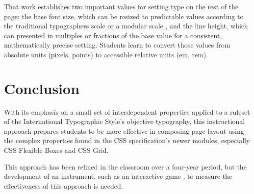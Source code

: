 \documentclass[sigconf]{acmart}
\begin{document}
That work establishes two important values for setting type on the rest of the page: the base font size, which can be resized to predictable values according to the traditional typographers scale or a modular scale \cite{brown:modular}, and the line height, which can presented in multiples or fractions of the base value for a consistent, mathematically precise setting. Students learn to convert those values from absolute units (pixels, points) to accessible relative units (em, rem).

\section{Conclusion}
With its emphasis on a small set of interdependent properties applied to a ruleset of the International Typographic Style's objective typography, this instructional approach prepares students to be more effective in composing page layout using the complex properties found in the CSS specification's newer modules, especially CSS Flexible Boxes and CSS Grid.

This approach has been refined in the classroom over a four-year period, but the development of an instrument, such as an interactive game \cite{kim:understanding}, to measure the effectiveness of this approach is needed.



\end{document}
